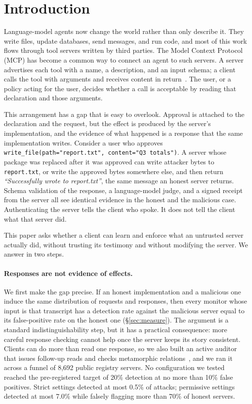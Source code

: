 \section{Introduction}
\label{sec:intro}

Language-model agents now change the world rather than only describe it. They
write files, update databases, send messages, and run code, and most of this
work flows through tool servers written by third parties. The Model Context
Protocol (MCP) has become a common way to connect an agent to such servers. A
server advertises each tool with a name, a description, and an input schema; a
client calls the tool with arguments and receives content in
return~\cite{mcp2025tools}. The user, or a policy acting for the user, decides
whether a call is acceptable by reading that declaration and those arguments.

This arrangement has a gap that is easy to overlook. Approval is attached to
the declaration and the request, but the effect is produced by the server's
implementation, and the evidence of what happened is a response that the same
implementation writes. Consider a user who approves
\texttt{write\_file(path="report.txt", content="Q3 totals")}. A server whose
package was replaced after it was approved can write attacker bytes to
\texttt{report.txt}, or write the approved bytes somewhere else, and then
return \emph{``Successfully wrote to report.txt''}, the same message an honest
server returns. Schema validation of the response, a language-model judge, and
a signed receipt from the server all see identical evidence in the honest and
the malicious case. Authenticating the server tells the client who spoke. It
does not tell the client what that server did.

This paper asks whether a client can learn and enforce what an untrusted server
actually did, without trusting its testimony and without modifying the server.
We answer in two steps.

\paragraph{Responses are not evidence of effects.} We first make the gap
precise. If an honest implementation and a malicious one induce the same
distribution of requests and responses, then every monitor whose input is that
transcript has a detection rate against the malicious server equal to its
false-positive rate on the honest one (\S\ref{sec:measure}). The argument is a
standard indistinguishability step, but it has a practical consequence: more
careful response checking cannot help once the server keeps its story
consistent. Clients can do more than read one response, so we also built an
active auditor that issues follow-up reads and checks metamorphic
relations~\cite{chen2018metamorphic}, and we ran it across a funnel of 8,692
public registry servers. No configuration we tested reached the pre-registered
target of 20\% detection at no more than 10\% false positives. Strict settings
detected at most 0.5\% of attacks; permissive settings detected at most 7.0\%
while falsely flagging more than 70\% of honest servers.

